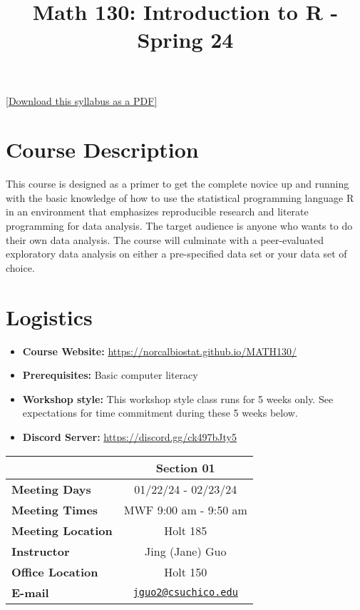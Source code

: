 \documentclass[
  11pt,
]{article}
\title{Math 130: Introduction to R - Spring 24}
\author{}
\date{\vspace{-2.5em}}
\providecommand{\tightlist}{%
  \setlength{\itemsep}{0pt}\setlength{\parskip}{0pt}}
\begin{document}
\maketitle

\href{syllabus.pdf}{{[}Download this syllabus as a PDF{]}}

\section{Course Description}\label{course-description}

This course is designed as a primer to get the complete novice up and
running with the basic knowledge of how to use the statistical
programming language R in an environment that emphasizes reproducible
research and literate programming for data analysis. The target audience
is anyone who wants to do their own data analysis. The course will
culminate with a peer-evaluated exploratory data analysis on either a
pre-specified data set or your data set of choice.

\section{Logistics}\label{logistics}

\begin{itemize}
\tightlist
\item
  \textbf{Course Website:}
  \url{https://norcalbiostat.github.io/MATH130/}
\item
  \textbf{Prerequisites:} Basic computer literacy
\item
  \textbf{Workshop style:} This workshop style class runs for 5 weeks
  only. See expectations for time commitment during these 5 weeks
  below.\\
\item
  \textbf{Discord Server:} \url{https://discord.gg/ck497bJty5}
\end{itemize}

\begin{longtable}[]{@{}lc@{}}
\toprule\noalign{}
& Section 01 \\
\midrule\noalign{}
\endhead
\bottomrule\noalign{}
\endlastfoot
\textbf{Meeting Days} & 01/22/24 - 02/23/24 \\
\textbf{Meeting Times} & MWF 9:00 am - 9:50 am \\
\textbf{Meeting Location} & Holt 185 \\
\textbf{Instructor} & Jing (Jane) Guo \\
\textbf{Office Location} & Holt 150 \\
\textbf{E-mail} &
\href{mailto:jguo2@csuchico.edu}{\nolinkurl{jguo2@csuchico.edu}} \\
\end{longtable}
\end{document}
